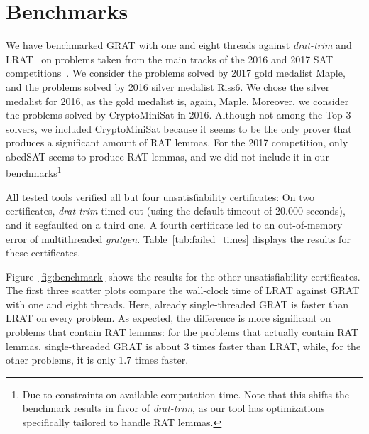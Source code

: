\documentclass[smallcondensed]{svjour3}     %
\begin{document}
\section{Benchmarks}\label{sec:benchmarks}
  We have benchmarked GRAT with one and eight threads against {\sl drat-trim} and LRAT~\cite{HHKW17} on problems taken from the main tracks of the 2016 and 2017 SAT 
  competitions~\cite{satcomp-2016,satcomp-2017}. We consider the problems solved by 2017 gold medalist Maple, and the problems solved by 2016 silver medalist Riss6.
  We chose the silver medalist for 2016, as the gold medalist is, again, Maple.
  Moreover, we consider the problems solved by CryptoMiniSat in 2016. Although not among the Top 3 solvers, we included CryptoMiniSat because it seems to be 
  the only prover that produces a significant amount of RAT lemmas. For the 2017 competition, only abcdSAT seems to produce RAT lemmas, and we did not include 
  it in our benchmarks\footnote{Due to constraints on available computation time. Note that this shifts the benchmark results in favor of {\sl drat-trim}, 
    as our tool has optimizations specifically tailored to handle RAT lemmas.}
    
  All tested tools verified all but four unsatisfiability certificates: On two certificates, {\sl drat-trim} timed out (using the default timeout of 20.000 seconds), 
  and it segfaulted on a third one. A fourth certificate led to an out-of-memory error of multithreaded {\sl gratgen}.
  Table~\ref{tab:failed_times} displays the results for these certificates. 
  
  Figure~\ref{fig:benchmark} shows the results for the other unsatisfiability certificates. The first three scatter plots compare the 
  wall-clock time of LRAT against GRAT with one and eight threads. Here, already single-threaded GRAT is faster than LRAT on every problem.
  As expected, the difference is more significant on problems that contain RAT lemmas: for the problems that actually contain RAT 
  lemmas, single-threaded GRAT is about 3 times faster than LRAT, while, for the other problems, it is only 1.7 times faster.
  
\end{document}
